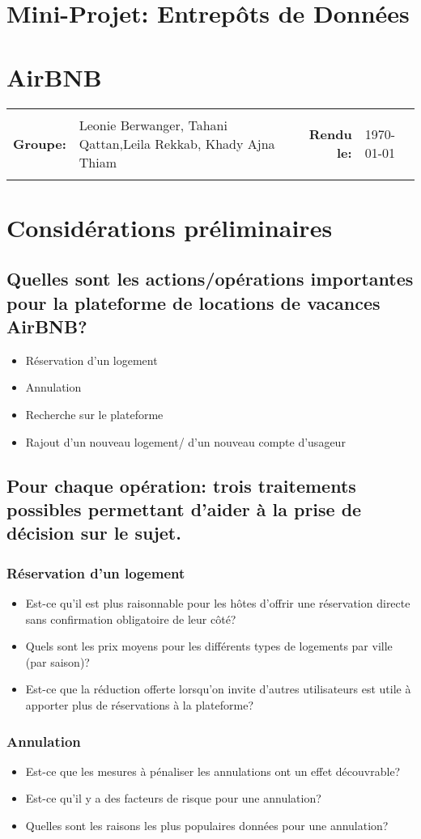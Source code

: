 \documentclass[11pt]{article}
\newcommand{\metaInfo}[4]{
	\begin{tabularx}{\textwidth}{rXrl}
	\hline \\
	\textbf{Groupe:}	& #1 &  \textbf{Rendu le:}   & #2 \\
	\\ \hline
	\end{tabularx}
}
\newcommand{\heading}[2]{
	\begin{center}
	\section*{#1}
	\section*{#2}
	\end{center}
}
\begin{document}
\heading{Mini-Projet: Entrepôts de Données}{AirBNB}
\metaInfo{Leonie Berwanger, Tahani Qattan,\newline Leila Rekkab, Khady Ajna Thiam}{\today}

\section{}
\section{Considérations préliminaires}
\subsection{Quelles sont les actions/opérations importantes pour la plateforme de locations de vacances AirBNB?}
\begin{itemize}
	\item Réservation d'un logement
	\item Annulation
	\item Recherche sur le plateforme
	\item Rajout d'un nouveau logement/ d'un nouveau compte d'usageur
\end{itemize}
\subsection{Pour chaque opération: trois traitements possibles permettant d’aider à la prise de décision sur le sujet.}
\subsubsection*{Réservation d'un logement}
\begin{itemize}
	\item Est-ce qu'il est plus raisonnable pour les hôtes d'offrir une réservation directe sans confirmation obligatoire de leur côté?
	\item Quels sont les prix moyens pour les différents types de logements par ville (par saison)?
	\item Est-ce que la réduction offerte lorsqu'on invite d'autres utilisateurs est utile à apporter plus de réservations à la plateforme?
\end{itemize}
\subsubsection*{Annulation}
\begin{itemize}
	\item Est-ce que les mesures à pénaliser les annulations ont un effet découvrable?
	\item  Est-ce qu'il y a des facteurs de risque pour une annulation?
	\item Quelles sont les raisons les plus populaires données pour une annulation?
\end{itemize}
\end{document}
